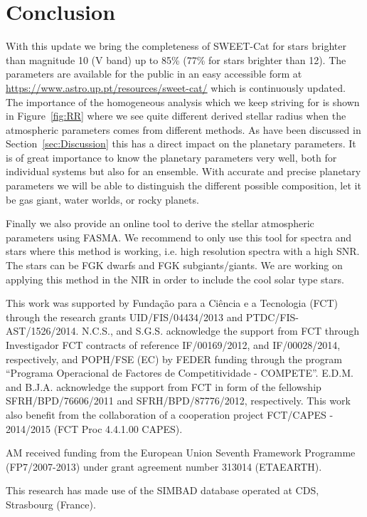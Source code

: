\documentclass{aa}
\begin{document}
\section{Conclusion}
\label{sec:conclusion}

With this update we bring the completeness of SWEET-Cat for stars brighter than
magnitude 10 (V band) up to 85\% (77\% for stars brighter than 12). The
parameters are available for the public in an easy accessible form at
\url{https://www.astro.up.pt/resources/sweet-cat/} which is continuously
updated. The importance of the homogeneous analysis which we keep striving for
is shown in Figure~\ref{fig:RR} where we see quite different derived stellar
radius when the atmospheric parameters comes from different methods. As have
been discussed in Section~\ref{sec:Discussion} this has a direct impact on the
planetary parameters. It is of great importance to know the planetary parameters
very well, both for individual systems but also for an ensemble. With accurate
and precise planetary parameters we will be able to distinguish the different
possible composition, let it be gas giant, water worlds, or rocky planets.

Finally we also provide an online tool to derive the stellar atmospheric
parameters using FASMA. We recommend to only use this tool for spectra and stars
where this method is working, i.e. high resolution spectra with a high SNR. The
stars can be FGK dwarfs and FGK subgiants/giants. We are working on applying
this method in the NIR in order to include the cool solar type stars.



\begin{acknowledgements}

This work was supported by Funda\c{c}\~ao para a Ci\^encia e a Tecnologia (FCT)
through the research grants UID/FIS/04434/2013 and PTDC/FIS-AST/1526/2014.
N.C.S., and S.G.S. acknowledge the support from FCT through Investigador FCT
contracts of reference IF/00169/2012, and IF/00028/2014, respectively, and
POPH/FSE (EC) by FEDER funding through the program “Programa Operacional de
Factores de Competitividade - COMPETE”. E.D.M. and B.J.A. acknowledge the
support from FCT in form of the fellowship SFRH/BPD/76606/2011 and
SFRH/BPD/87776/2012, respectively. This work also benefit from the collaboration
of a cooperation project FCT/CAPES - 2014/2015 (FCT Proc 4.4.1.00 CAPES).

AM received funding from the European Union Seventh Framework Programme
(FP7/2007-2013) under grant agreement number 313014 (ETAEARTH).

This research has made use of the SIMBAD database operated at CDS, Strasbourg
(France).

\end{acknowledgements}
\end{document}
